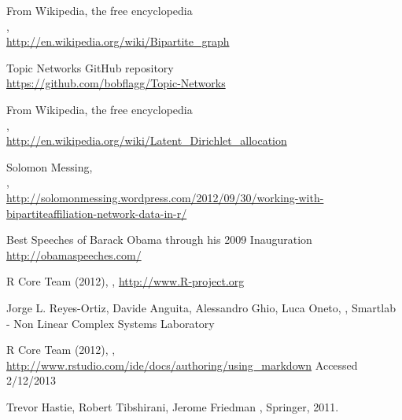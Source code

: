 \documentclass[%
	final,
	notitlepage,
	narroweqnarray,
	inline,
	]{ieee}
\begin{document}
\begin{thebibliography}{1}

From Wikipedia, the free encyclopedia \\
, \\
\newblock \url{http://en.wikipedia.org/wiki/Bipartite_graph}

Topic Networks GitHub repository \\
\newblock \url{https://github.com/bobflagg/Topic-Networks}

From Wikipedia, the free encyclopedia \\
, \\
\newblock \url{http://en.wikipedia.org/wiki/Latent_Dirichlet_allocation}

Solomon Messing, \\
, \\
\newblock \url{http://solomonmessing.wordpress.com/2012/09/30/working-with-bipartiteaffiliation-network-data-in-r/}

Best Speeches of Barack Obama through his 2009 Inauguration \\
\newblock \url{http://obamaspeeches.com/}


R Core Team (2012),
,
\newblock \url{http://www.R-project.org}

Jorge L. Reyes-Ortiz, Davide Anguita, Alessandro Ghio, Luca Oneto,
,
\newblock Smartlab - Non Linear Complex Systems Laboratory

R Core Team (2012),
,
\newblock \url{http://www.rstudio.com/ide/docs/authoring/using_markdown}
\newblock Accessed 2/12/2013

Trevor Hastie, Robert Tibshirani, Jerome Friedman
,
\newblock Springer, 2011.


\end{thebibliography}
\end{document}
